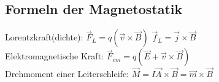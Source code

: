 \subsection{Formeln der Magnetostatik}
Lorentzkraft(dichte): $\vec F_L = q  (\vec v \times \vec B)$ \quad $\vec f_L = \vec j \times \vec B$\\
Elektromagnetische Kraft: $\vec F_{em} = q(\vec E + \vec v \times \vec B)$\\
Drehmoment einer Leiterschleife: $\vec M = I\vec A \times \vec B = \vec m \times \vec B$